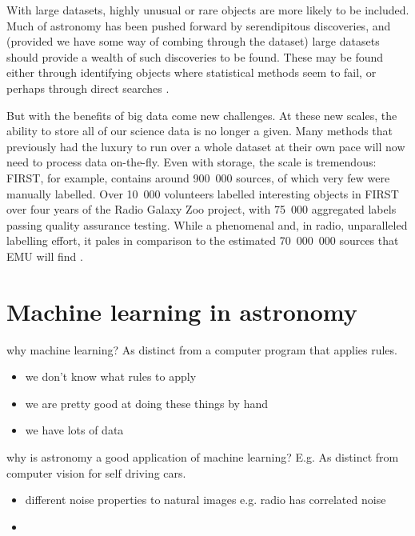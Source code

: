     With large datasets, highly unusual or rare objects are more likely to be included. Much of astronomy has been pushed forward by serendipitous discoveries, and (provided we have some way of combing through the dataset) large datasets should provide a wealth of such discoveries to be found. These may be found either through identifying objects where statistical methods seem to fail, or perhaps through direct searches \citep{norris17unexpected}.

    But with the benefits of big data come new challenges. At these new scales, the ability to store all of our science data is no longer a given. Many methods that previously had the luxury to run over a whole dataset at their own pace will now need to process data on-the-fly. Even with storage, the scale is tremendous: FIRST, for example, contains around 900~000 sources, of which very few were manually labelled. Over 10~000 volunteers labelled interesting objects in FIRST over four years of the Radio Galaxy Zoo project, with 75~000 aggregated labels passing quality assurance testing. While a phenomenal and, in radio, unparalleled labelling effort, it pales in comparison to the estimated 70~000~000 sources that EMU will find \citep{banfield15}.

\section{Machine learning in astronomy}
\label{sec:ml-in-astro}

    why machine learning? As distinct from a computer program that applies rules. \begin{itemize}
        \item we don't know what rules to apply
        \item we are pretty good at doing these things by hand
        \item we have lots of data
    \end{itemize}
    why is astronomy a good application of machine learning? E.g. As distinct from computer vision for self driving cars. \begin{itemize}
        \item different noise properties to natural images e.g. radio has correlated noise
        \item 
    \end{itemize}

